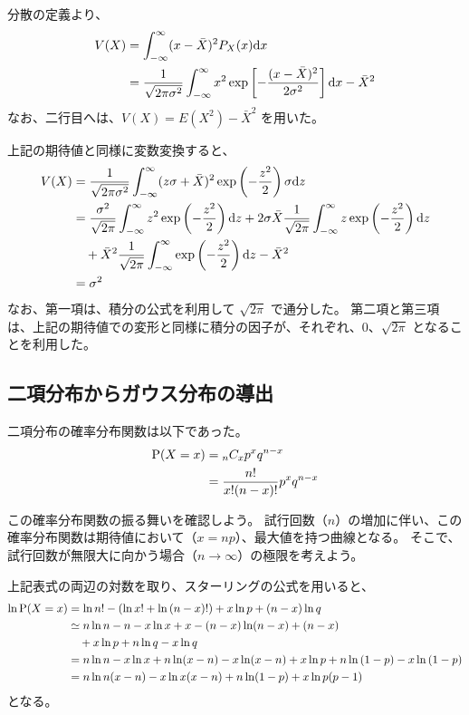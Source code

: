 \documentclass[uplatex,dvipdfmx,a4paper,11pt, titlepage]{jsarticle}
\newcommand{\diff}{\mathrm d}
\begin{document}
\begin{appendix}
分散の定義より、
\begin{align}
V(X) 
	&= \int_{-\infty}^{\infty} (x - \bar{X})^2 P_X(x) \diff x \notag \\
	&= \frac{1}{\sqrt{2 \pi \sigma^2}} \int_{-\infty}^{\infty} x^2 \exp \left[- \frac{(x -\bar{X})^2}{2 \sigma^2} \right] \diff x - \bar{X}^2
\end{align}
なお、二行目へは、$V(X)=E(X^2)-\bar{X}^2$ を用いた。

上記の期待値と同様に変数変換すると、
\begin{align}
V(X) 
	&= \frac{1}{\sqrt{2 \pi \sigma^2}}  \int_{-\infty}^{\infty} (z\sigma + \bar{X})^2 \exp \left(- \frac{z^2}{2} \right) \sigma \diff z \notag \\
	&= \frac{\sigma^2}{\sqrt{2 \pi}}  \int_{-\infty}^{\infty} z^2 \exp \left(- \frac{z^2}{2} \right) \diff z + 2\sigma \bar{X} \frac{1}{\sqrt{2 \pi}} \int_{-\infty}^{\infty} z \exp \left(- \frac{z^2}{2} \right) \diff z \notag \\
	&\quad + \bar{X}^2 \frac{1}{\sqrt{2 \pi}} \int_{-\infty}^{\infty} \exp \left(- \frac{z^2}{2} \right) \diff z - \bar{X}^2 \notag \\
	&= \sigma^2
\end{align}
なお、第一項は、積分の公式を利用して $\sqrt{2 \pi}$ で通分した。
第二項と第三項は、上記の期待値での変形と同様に積分の因子が、それぞれ、0、$\sqrt{2 \pi}$ となることを利用した。


\subsection{二項分布からガウス分布の導出}
二項分布の確率分布関数は以下であった。
\begin{align}
{\rm P}(X=x) 
	&= {}_nC_x p^x q^{n-x} \notag \\
	&= \dfrac{n!}{x!(n - x)!} p^x q^{n-x} 
\end{align}

この確率分布関数の振る舞いを確認しよう。
試行回数（$n$）の増加に伴い、この確率分布関数は期待値において（$x=np$）、最大値を持つ曲線となる。
そこで、試行回数が無限大に向かう場合（$n \rightarrow \infty $）の極限を考えよう。

上記表式の両辺の対数を取り、スターリングの公式を用いると、
\begin{align*}
\ln {\rm P}(X=x) 
	&= \ln {n!} -(\ln {x!} + \ln {(n - x)!}) + x \ln{p} + (n-x) \ln q  \notag \\
	&\simeq n\ln {n} -n - x\ln {x} + x - (n-x) \ln (n - x) + (n-x) \notag \\
	&\quad + x \ln{p} + n\ln{q} - x\ln{q} \notag \\
	&= n\ln {n} - x\ln {x} + n \ln (x-n) - x \ln (x-n) + x \ln{p} + n\ln{(1-p)} - x\ln{(1-p)} \notag \\
	&= n\ln n(x-n) - x\ln x(x-n) + n\ln (1-p) + x\ln p(p-1)
\end{align*}
となる。


\end{appendix}
\end{document}
